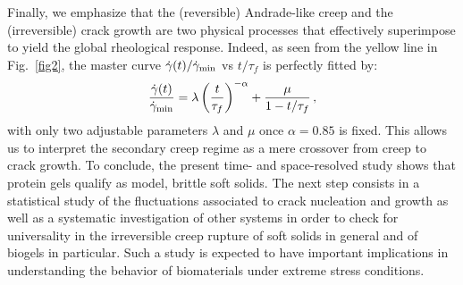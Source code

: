 \documentclass[twocolumn,superscriptaddress,showpacs,preprintnumbers,amsmath,amssymb,prl]{revtex4}
\newcommand\gp{\dot\gamma}
\begin{document}
Finally, we emphasize that the (reversible) Andrade-like creep and the (irreversible) crack growth are two  physical processes that effectively superimpose to yield the global rheological response. Indeed, as seen from the yellow line in Fig.~\ref{fig2}, the master curve $\gp(t)/\gp_{\rm min}$ vs $t/\tau_f$ is perfectly fitted by:
\begin{equation}
\frac{\gp(t)}{\gp_{\rm min}}=\lambda \left(\frac{t}{\tau_f}\right)^{-\alpha}+ \frac{\mu}{1-t/\tau_f}\,,
\label{e.fit}
\end{equation}
with only two adjustable parameters $\lambda$ and $\mu$ once $\alpha=0.85$ is fixed. This allows us to interpret the secondary creep regime as a mere crossover from creep to crack growth. To conclude, the present time- and space-resolved study shows that protein gels qualify as model, brittle soft solids. The next step consists in a statistical study of the fluctuations associated to crack nucleation and growth as well as a systematic investigation of other systems in order to check for universality in the irreversible creep rupture of soft solids in general and of biogels in particular. Such a study is expected to have important implications in understanding the behavior of biomaterials under extreme stress conditions. 



\end{document}
